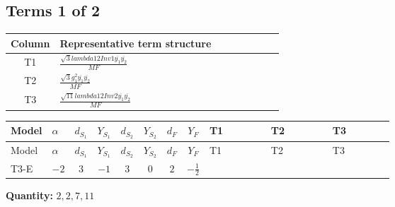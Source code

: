 \documentclass[8pt]{article}
\begin{document}
\begin{landscape}
\subsection*{Terms 1 of 2}
\begin{center}
\begin{tabular}{@{}c >{\raggedright\arraybackslash}p{0.82\linewidth}@{}}
\toprule
Column & Representative term structure \\
\midrule
T1 & \(\displaystyle \frac{\sqrt{3} lambda12Inv1 \overline{y_{1}} \overline{y_{2}}}{MF}\) \\
\midrule
T2 & \(\displaystyle \frac{\sqrt{3} g_{1}^{2} \overline{y_{1}} \overline{y_{2}}}{MF}\) \\
\midrule
T3 & \(\displaystyle \frac{\sqrt{11} lambda12Inv2 \overline{y_{1}} \overline{y_{2}}}{MF}\) \\
\midrule
\bottomrule
\end{tabular}
\end{center}
\smallskip
\tiny
\begin{longtable}{@{}llcccccc >{\raggedright\arraybackslash}p{0.21\linewidth} >{\raggedright\arraybackslash}p{0.21\linewidth} >{\raggedright\arraybackslash}p{0.21\linewidth}@{}}
\toprule
Model & $\alpha$ & $d_{S_1}$ & $Y_{S_1}$ & $d_{S_2}$ & $Y_{S_2}$ & $d_F$ & $Y_F$ & T1 & T2 & T3 \\
\midrule
\endfirsthead
\toprule
Model & $\alpha$ & $d_{S_1}$ & $Y_{S_1}$ & $d_{S_2}$ & $Y_{S_2}$ & $d_F$ & $Y_F$ & T1 & T2 & T3 \\
\midrule
\endhead
T3-E & $-2$ & $3$ & $-1$ & $3$ & $0$ & $2$ & $-\frac{1}{2}$ & \scriptsize\adjustbox{max width=\linewidth}{$\begin{gathered} - \frac{\sqrt{3} lambda12Inv1 \overline{y_{1}} \overline{y_{2}}}{6 MF}\end{gathered}$} & \scriptsize\adjustbox{max width=\linewidth}{$\begin{gathered} \frac{\sqrt{3} g_{1}^{2} \overline{y_{1}} \overline{y_{2}}}{8 MF}\end{gathered}$} & \scriptsize\adjustbox{max width=\linewidth}{$\begin{gathered} \frac{3 \sqrt{11} lambda12Inv2 \overline{y_{1}} \overline{y_{2}}}{22 MF}\end{gathered}$} \\
\midrule
\bottomrule
\end{longtable}
\clearpage
\noindent\textbf{Quantity: }$\mathrm{2,2,7,11}$\par\smallskip

\end{landscape}
\end{document}
